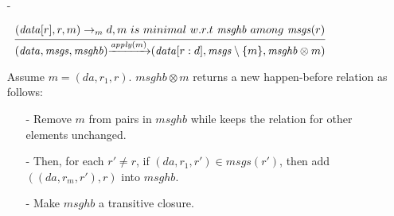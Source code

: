 \begin {itemize}
\begin{itemize}
    Assume message of $\mathit{msgs}'$ is in the form $(\mathit{da},\_,\_)$. Let $\mathit{msgs}(r)$ be the set of messages of $\mathit{msgs}$ with destination replica identifier $r$. $\mathit{msghb} \otimes \mathit{msgs}'$ returns a new message happen-before relation as follows:

        \begin{itemize}
        \setlength{\itemsep}{0.5pt}
        \item[-] For each replica $r' \in \mathbb{R}$, in $\mathit{msgs}(r')$, if $(\mathit{msg}_1,r) \in \mathit{hb}$, then remove $(\mathit{msg}_1,r)$ from $\mathit{msghb}$ and add $(m_1,(\mathit{da},r,r'))$ into $\mathit{hb}$,

        \item[-] For each replica $r' \in \mathbb{R}$, if $\mathit{msg}_1$ is maximal among $\{ (\_,r,r') \}$ w.r.t $\mathit{msghb}$, then add $(\mathit{msg}_1,(\mathit{da},r,r'))$ into $\mathit{hb}$.

        \item[-] Make $\mathit{msghb}$ a transitive closure.
        \end{itemize}

    \item[-]

        $\begin{array}{l c} \bigfrac{ (\mathit{data}[r],r,m) \rightarrow_m d, m \ is \ minimal \ w.r.t \ \mathit{msghb} \ among \ \mathit{msgs}(r) } {(\mathit{data},\mathit{msgs},\mathit{msghb}) {\xrightarrow{\mathit{apply}(m)}} (\mathit{data}[r:d],\mathit{msgs} \setminus \{ m \}, \mathit{msghb} \otimes m )} \end{array}$

         Assume $m = (\mathit{da},r_1,r)$. $\mathit{msghb} \otimes m$ returns a new happen-before relation as follows:

        \begin{itemize}
        \setlength{\itemsep}{0.5pt}
        \item[-] Remove $m$ from pairs in $\mathit{msghb}$ while keeps the relation for other elements unchanged.

        \item[-] Then, for each $r' \neq r$, if $(\mathit{da},r_1,r') \in \mathit{msgs}(r')$, then add $((\mathit{da},r_m,r'),r)$ into $\mathit{msghb}$.

        \item[-] Make $\mathit{msghb}$ a transitive closure.
        \end{itemize}
    \end{itemize}
\end{itemize}

